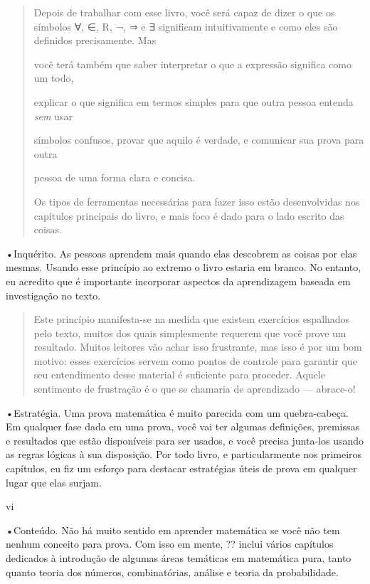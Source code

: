 \documentclass[
]{article}
\begin{document}
\begin{quote}
Depois de trabalhar com esse livro, você será capaz de dizer o que os
símbolos ∀, ∈, R, ¬, ⇒ e ∃ significam intuitivamente e como eles são
definidos precisamente. Mas

você terá também que saber interpretar o que a expressão significa como
um todo,

explicar o que significa em termos simples para que outra pessoa entenda
\emph{sem} usar

símbolos confusos, provar que aquilo é verdade, e comunicar sua prova
para outra

pessoa de uma forma clara e concisa.

Os tipos de ferramentas necessárias para fazer isso estão desenvolvidas
nos capítulos principais do livro, e mais foco é dado para o lado
escrito das coisas.
\end{quote}

•Inquérito. As pessoas aprendem mais quando elas descobrem as coisas por
elas mesmas. Usando esse princípio ao extremo o livro estaria em branco.
No entanto, eu acredito que é importante incorporar aspectos da
aprendizagem baseada em investigação no texto.

\begin{quote}
Este princípio manifesta-se na medida que existem exercícios espalhados
pelo texto, muitos dos quais simplesmente requerem que você prove um
resultado. Muitos leitores vão achar isso frustrante, mas isso é por um
bom motivo: esses exercícios servem como pontos de controle para
garantir que seu entendimento desse material é suficiente para proceder.
Aquele sentimento de frustração é o que se chamaria de aprendizado ---
abrace-o!
\end{quote}

•Estratégia. Uma prova matemática é muito parecida com um quebra-cabeça.
Em qualquer fase dada em uma prova, você vai ter algumas definições,
premissas e resultados que estão disponíveis para ser usados, e você
precisa junta-los usando as regras lógicas à sua disposição. Por todo
livro, e particularmente nos primeiros capítulos, eu fiz um esforço para
destacar estratégias úteis de prova em qualquer lugar que elas surjam.

vi

•Conteúdo. Não há muito sentido em aprender matemática se você não tem
nenhum conceito para prova. Com isso em mente, ?? inclui vários
capítulos dedicados à introdução de algumas áreas temáticas em
matemática pura, tanto quanto teoria dos números, combinatórias, análise
e teoria da probabilidade.
\end{document}

